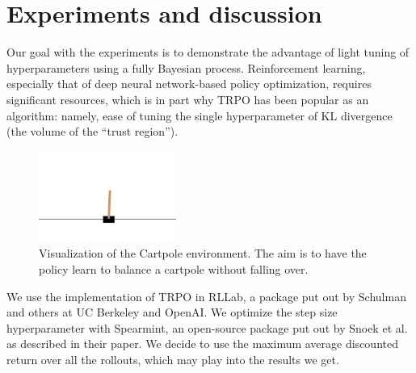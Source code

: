 \documentclass[12pt]{article}
\theoremstyle{plain}
\begin{document}
\section{Experiments and discussion}

Our goal with the experiments is to demonstrate the advantage of light tuning of hyperparameters using a fully Bayesian process. Reinforcement learning, especially that of deep neural network-based policy optimization, requires significant resources, which is in part why TRPO has been popular as an algorithm: namely, ease of tuning the single hyperparameter of KL divergence (the volume of the ``trust region'').

\begin{figure}[H]
  \centering
  \includegraphics[width=0.4\textwidth]{cartpole.jpg}

  \caption{Visualization of the Cartpole environment. The aim is to have the policy learn to balance a cartpole without falling over.}
\end{figure}


We use the implementation of TRPO in RLLab, a package put out by Schulman and others at UC Berkeley and OpenAI. We optimize the step size hyperparameter with Spearmint, an open-source package put out by Snoek et al. as described in their paper. We decide to use the maximum average discounted return over all the rollouts, which may play into the results we get.

\end{document}
